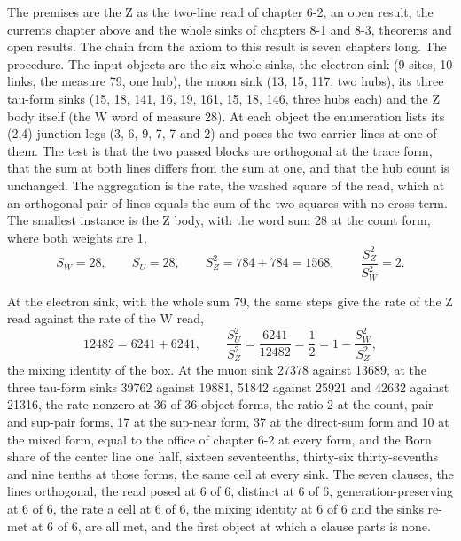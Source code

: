 \begin{chproof}
The premises are the Z as the two-line read of chapter 6-2, an open result, the currents chapter above and the whole sinks of chapters 8-1 and 8-3, theorems and open results. The chain from the axiom to this result is seven chapters long. The procedure. The input objects are the six whole sinks, the electron sink (9 sites, 10 links, the measure 79, one hub), the muon sink (13, 15, 117, two hubs), its three tau-form sinks (15, 18, 141, 16, 19, 161, 15, 18, 146, three hubs each) and the Z body itself (the W word of measure 28). At each object the enumeration lists its (2,4) junction legs (3, 6, 9, 7, 7 and 2) and poses the two carrier lines at one of them. The test is that the two passed blocks are orthogonal at the trace form, that the sum at both lines differs from the sum at one, and that the hub count is unchanged. The aggregation is the rate, the washed square of the read, which at an orthogonal pair of lines equals the sum of the two squares with no cross term. The smallest instance is the Z body, with the word sum 28 at the count form, where both weights are 1,
\begin{equation}
S_W = 28, \qquad S_U = 28, \qquad S_Z^{2} = 784 + 784 = 1568 , \qquad \frac{S_Z^{2}}{S_W^{2}} = 2 .
\end{equation}

At the electron sink, with the whole sum 79, the same steps give the rate of the Z read against the rate of the W read,
\begin{equation}
12482 = 6241 + 6241 , \qquad \frac{S_U^{2}}{S_Z^{2}} = \frac{6241}{12482} = \frac{1}{2} = 1 - \frac{S_W^{2}}{S_Z^{2}} ,
\end{equation}
the mixing identity of the box. At the muon sink 27378 against 13689, at the three tau-form sinks 39762 against 19881, 51842 against 25921 and 42632 against 21316, the rate nonzero at 36 of 36 object-forms, the ratio 2 at the count, pair and sup-pair forms, 17 at the sup-near form, 37 at the direct-sum form and 10 at the mixed form, equal to the office of chapter 6-2 at every form, and the Born share of the center line one half, sixteen seventeenths, thirty-six thirty-sevenths and nine tenths at those forms, the same cell at every sink. The seven clauses, the lines orthogonal, the read posed at 6 of 6, distinct at 6 of 6, generation-preserving at 6 of 6, the rate a cell at 6 of 6, the mixing identity at 6 of 6 and the sinks re-met at 6 of 6, are all met, and the first object at which a clause parts is none.


\end{chproof}
